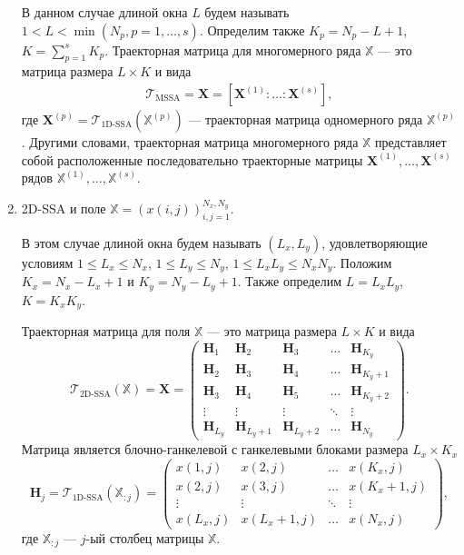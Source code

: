 \documentclass[specialist,
               substylefile = spbu.rtx,
               subf,href,colorlinks=true, 12pt]{disser}
\begin{document}
\begin{enumerate}
 В данном случае длиной окна $L$ будем называть $1< L < \min(N_p,p=1,\ldots,s)$. Определим также $K_p = N_p - L + 1$, $K = \sum_{p=1}^{s} K_p$. Траекторная матрица для многомерного ряда $\mathbb{X}$ --- это матрица размера $L \times K$ и вида
\begin{gather*}
\mathcal{T}_{\text{MSSA}} = \mathbf{X} = \left[ \mathbf{X}^{(1)}: \ldots :  \mathbf{X}^{(s)}  \right],
\end{gather*}
где $\mathbf{X}^{(p)}= \mathcal{T}_{\text{1D-SSA}} \left(\mathbb{X}^{(p)} \right)$ --- траекторная матрица одномерного ряда $\mathbb{X}^{(p)}$.
Другими словами, траекторная матрица многомерного ряда $\mathbb{X}$ представляет собой расположенные последовательно траекторные матрицы $\mathbf{X}^{(1)},\ldots, \mathbf{X}^{(s)}$ рядов $\mathbb{X}^{(1)}, \ldots, \mathbb{X}^{(s)}$.

\item 2D-SSA и поле $\mathbb{X}= \left(x(i,j) \right)_{i,j=1}^{N_x,N_y}$.

В этом случае длиной окна будем называть $(L_x, L_y)$, удовлетворяющие условиям $1 \leqslant L_x \leqslant N_x$, $1 \leqslant L_y \leqslant N_y$, $1 \leqslant L_x L_y \leqslant N_x N_y$. Положим $K_x = N_x - L_x + 1$ и $K_y = N_y - L_y + 1$. Также определим $L = L_x L_y$, $K = K_x K_y$.

Траекторная матрица для поля $\mathbb{X}$ --- это матрица размера $L \times K$ и вида
\begin{equation*}
\mathcal{T}_{\text{2D-SSA}}(\mathbb{X}) = \mathbf{X}= \begin{pmatrix}
			\mathbf{H}_1 & \mathbf{H}_2 & \mathbf{H}_3 & \ldots & \mathbf{H}_{K_y} \\
			\mathbf{H}_2 & \mathbf{H}_3 & \mathbf{H}_4 & \ldots & \mathbf{H}_{K_y+1} \\
			\mathbf{H}_3 & \mathbf{H}_4 & \mathbf{H}_5 & \ldots & \mathbf{H}_{K_y+2} \\
			\vdots &\vdots & \vdots & \ddots & \vdots \\
			\mathbf{H}_{L_y} & \mathbf{H}_{L_y+1} & \mathbf{H}_{L_y+2} & \ldots & \mathbf{H}_{N_y}
			\end{pmatrix}.
\end{equation*}
Матрица является блочно-ганкелевой с ганкелевыми блоками размера $L_x \times K_x$
\begin{equation*}
\mathbf{H}_j = \mathcal{T}_{\text{1D-SSA}}(\mathbb{X}_{:j})  = \begin{pmatrix}
			x(1,j) & x(2,j) & \ldots & x(K_x, j) \\
			x(2,j) & x(3,j) & \ldots & x(K_x+1, j) \\
			\vdots  & \vdots & \ddots & \vdots \\
			x(L_x, j) & x(L_x+1, j) & \ldots & x(N_x, j)
			\end{pmatrix},
\end{equation*}
где $\mathbb{X}_{:j}$ --- $j$-ый столбец матрицы $\mathbb{X}$.
\end{enumerate}
\end{document}
